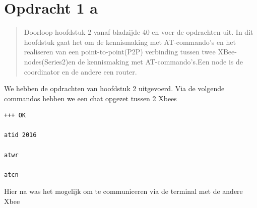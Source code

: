 \documentclass[12pt]{article}
\begin{document}
\clearpage

{}
\section*{Opdracht 1 a}
\begin{quote}
Doorloop hoofdstuk 2 vanaf bladzijde 40 en voer de opdrachten uit. In dit hoofdstuk gaat het om de kennismaking met AT-commando’s en het realiseren van een point-to-point(P2P) verbinding tussen twee XBee-nodes(Series2)en de kennismaking met AT-commando’s.Een node is de coordinator en de andere een router.
\end{quote}
We hebben de opdrachten van hoofdstuk 2 uitgevoerd. Via de volgende commandos hebben we een chat opgezet tussen 2 Xbees
\begin{lstlisting}
+++ OK

atid 2016

atwr

atcn
\end{lstlisting}
Hier na was het mogelijk om te communiceren via de terminal met de andere Xbee
\newpage
\end{document}
